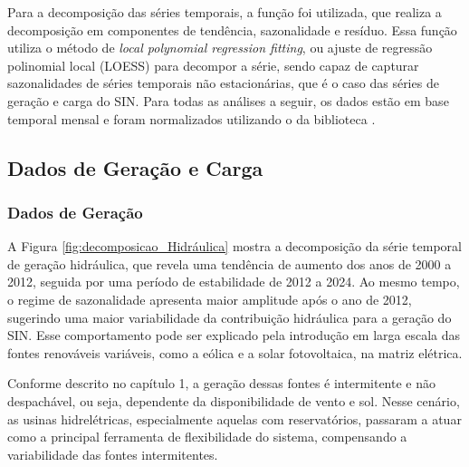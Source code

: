 Para a decomposição das séries temporais, a função  foi utilizada, que realiza a decomposição em componentes de 
tendência, sazonalidade e resíduo. Essa função utiliza o método de \textit{local polynomial regression fitting}, ou ajuste
de regressão polinomial local (LOESS) para decompor a série, sendo capaz de capturar sazonalidades de séries temporais
não estacionárias, que é o caso das séries de geração e carga do SIN. Para todas as análises a seguir, os dados estão
em base temporal mensal e foram normalizados utilizando o  da biblioteca .

\subsection{Dados de Geração e Carga} %
\subsubsection{Dados de Geração} %
A Figura \ref{fig:decomposicao_Hidráulica} mostra a decomposição da série temporal de geração hidráulica, que revela uma 
tendência de aumento dos anos de 2000 a 2012, seguida por uma período de estabilidade de 2012 a 2024. Ao mesmo tempo,
o regime de sazonalidade apresenta maior amplitude após o ano de 2012, sugerindo uma maior variabilidade da contribuição
hidráulica para a geração do SIN. Esse comportamento pode ser explicado pela introdução em larga escala das fontes renováveis 
variáveis, como a eólica e a solar fotovoltaica, na matriz elétrica. \cite{Silva2016}
\begin{figure}[!ht]
  {}
  {}
\end{figure}

\begin{figure}[!ht]
  {}
  {}
\end{figure}

Conforme descrito no capítulo 1, a geração dessas fontes é intermitente e não despachável, ou seja, dependente da 
disponibilidade de vento e sol. Nesse cenário, as usinas hidrelétricas, especialmente aquelas com reservatórios, passaram 
a atuar como a principal ferramenta de flexibilidade do sistema, compensando a variabilidade das fontes intermitentes. 

